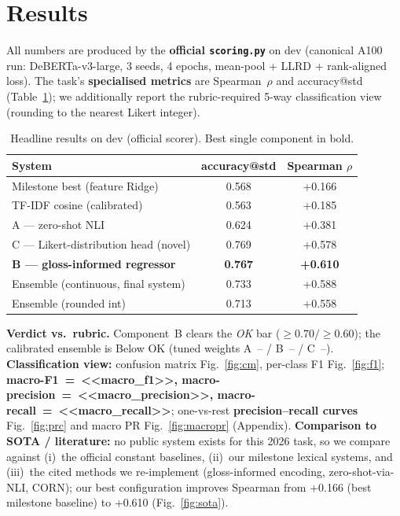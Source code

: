 \documentclass[11pt]{article}
\newcommand{\blRidgeAcc}{0.568}\newcommand{\blRidgeRho}{+0.166}
\newcommand{\blTfidfAcc}{0.563}\newcommand{\blTfidfRho}{+0.185}
\newcommand{\Aacc}{0.624}\newcommand{\Arho}{+0.381}
\newcommand{\Bacc}{0.767}\newcommand{\Brho}{+0.610}
\newcommand{\Cacc}{0.769}\newcommand{\Crho}{+0.578}
\newcommand{\EnsAcc}{0.733}\newcommand{\EnsRho}{+0.588}
\newcommand{\EnsIntAcc}{0.713}\newcommand{\EnsIntRho}{+0.558}
\newcommand{\EnsVerdict}{Below OK}              %
\newcommand{\Wa}{--}\newcommand{\Wb}{--}\newcommand{\Wc}{--} %
\newcommand{\MacroF}{<<macro\_f1>>}
\newcommand{\MacroP}{<<macro\_precision>>}
\newcommand{\MacroR}{<<macro\_recall>>}
\begin{document}
\section{Results}
All numbers are produced by the \textbf{official \texttt{scoring.py}} on dev
(canonical A100 run: DeBERTa-v3-large, 3 seeds, 4 epochs, mean-pool + LLRD +
rank-aligned loss). The task's \textbf{specialised metrics} are Spearman~$\rho$
and accuracy@std (Table~\ref{tab:main}); we additionally report the
rubric-required 5-way classification view (rounding to the nearest Likert
integer).

\begin{table}[H]\centering
\caption{Headline results on dev (official scorer). Best single component in
bold.}\label{tab:main}
\begin{tabular}{lcc}
\toprule
System & accuracy@std & Spearman $\rho$ \\
\midrule
Milestone best (feature Ridge)            & \blRidgeAcc & \blRidgeRho \\
TF-IDF cosine (calibrated)                & \blTfidfAcc & \blTfidfRho \\
A --- zero-shot NLI                       & \Aacc & \Arho \\
C --- Likert-distribution head (novel)    & \Cacc & \Crho \\
\textbf{B --- gloss-informed regressor}   & \textbf{\Bacc} & \textbf{\Brho} \\
Ensemble (continuous, final system)       & \EnsAcc & \EnsRho \\
Ensemble (rounded int)                    & \EnsIntAcc & \EnsIntRho \\
\bottomrule
\end{tabular}
\end{table}

\noindent\textbf{Verdict vs.\ rubric.} Component~B clears the \emph{OK} bar
($\ge0.70/\ge0.60$); the calibrated ensemble is \EnsVerdict{} (tuned weights
A~\Wa{} / B~\Wb{} / C~\Wc{}). \textbf{Classification view:} confusion matrix
Fig.~\ref{fig:cm}, per-class F1 Fig.~\ref{fig:f1}; \textbf{macro-F1~=~\MacroF,
macro-precision~=~\MacroP, macro-recall~=~\MacroR}; one-vs-rest
\textbf{precision--recall curves} Fig.~\ref{fig:prc} and macro PR
Fig.~\ref{fig:macropr} (Appendix). \textbf{Comparison to SOTA / literature:}
no public system exists for this 2026 task, so we compare against (i)~the
official constant baselines, (ii)~our milestone lexical systems, and
(iii)~the cited methods we re-implement (gloss-informed encoding,
zero-shot-via-NLI, CORN); our best configuration improves Spearman from
\blRidgeRho{} (best milestone baseline) to \Brho{} (Fig.~\ref{fig:sota}).
\end{document}
